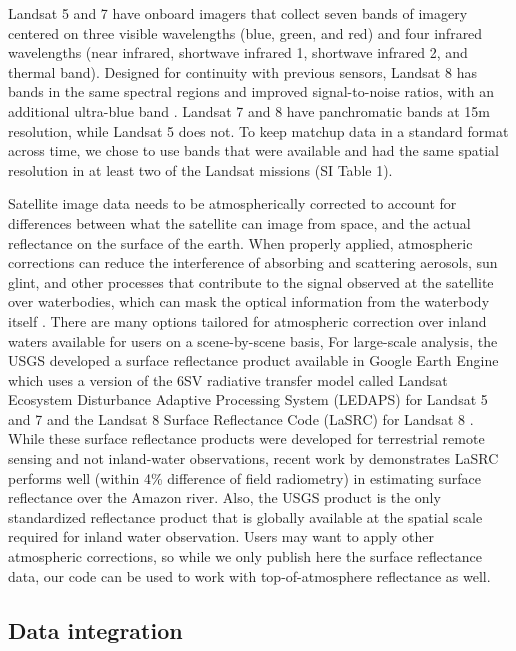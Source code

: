 \documentclass[draft,linenumbers]{agujournal2018}
\begin{document}
Landsat 5 and 7 have onboard imagers that collect seven bands of imagery
centered on three visible wavelengths (blue, green, and red) and four
infrared wavelengths (near infrared, shortwave infrared 1, shortwave
infrared 2, and thermal band). Designed for continuity with previous
sensors, Landsat 8 has bands in the same spectral regions and improved
signal-to-noise ratios, with an additional ultra-blue band
\citep{Barsi2014}. Landsat 7 and 8 have panchromatic bands at 15m
resolution, while Landsat 5 does not. To keep matchup data in a standard
format across time, we chose to use bands that were available and had
the same spatial resolution in at least two of the Landsat missions (SI
Table 1).

Satellite image data needs to be atmospherically corrected to account
for differences between what the satellite can image from space, and the
actual reflectance on the surface of the earth. When properly applied,
atmospheric corrections can reduce the interference of absorbing and
scattering aerosols, sun glint, and other processes that contribute to
the signal observed at the satellite over waterbodies, which can mask
the optical information from the waterbody itself \citep{Gordon1997}.
There are many options tailored for atmospheric correction over inland
waters available for users on a scene-by-scene basis, For large-scale
analysis, the USGS developed a surface reflectance product available in
Google Earth Engine which uses a version of the 6SV radiative transfer
model called Landsat Ecosystem Disturbance Adaptive Processing System
(LEDAPS) for Landsat 5 and 7 \citep{Ju2012} and the Landsat 8 Surface
Reflectance Code (LaSRC) for Landsat 8 \citep{Doxani2018,Vermote2016}.
While these surface reflectance products were developed for terrestrial
remote sensing and not inland-water observations, recent work by
\citet{Kuhn2019} demonstrates LaSRC performs well (within 4\% difference
of field radiometry) in estimating surface reflectance over the Amazon
river. Also, the USGS product is the only standardized reflectance
product that is globally available at the spatial scale required for
inland water observation. Users may want to apply other atmospheric
corrections, so while we only publish here the surface reflectance data,
our code can be used to work with top-of-atmosphere reflectance as well.

\subsection{Data integration}
\end{document}
